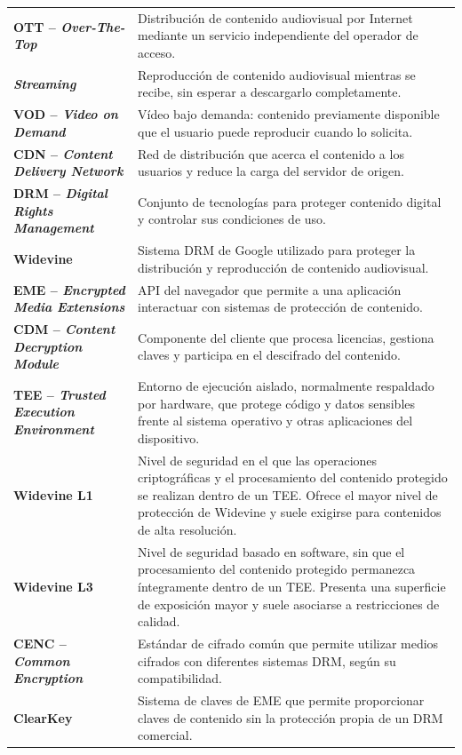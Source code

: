 \begin{longtable}{@{}>{\raggedright\arraybackslash\bfseries}p{}>{\raggedright\arraybackslash}p{}@{}}
OTT -- \textit{Over-The-Top} & Distribución de contenido audiovisual por Internet mediante un servicio independiente del operador de acceso. \\
\textit{Streaming} & Reproducción de contenido audiovisual mientras se recibe, sin esperar a descargarlo completamente. \\
VOD -- \textit{Video on Demand} & Vídeo bajo demanda: contenido previamente disponible que el usuario puede reproducir cuando lo solicita. \\
CDN -- \textit{Content Delivery Network} & Red de distribución que acerca el contenido a los usuarios y reduce la carga del servidor de origen. \\
DRM -- \textit{Digital Rights Management} & Conjunto de tecnologías para proteger contenido digital y controlar sus condiciones de uso. \\
Widevine & Sistema DRM de Google utilizado para proteger la distribución y reproducción de contenido audiovisual. \\
EME -- \textit{Encrypted Media Extensions} & API del navegador que permite a una aplicación interactuar con sistemas de protección de contenido. \\
CDM -- \textit{Content Decryption Module} & Componente del cliente que procesa licencias, gestiona claves y participa en el descifrado del contenido. \\
TEE -- \textit{Trusted Execution Environment} & Entorno de ejecución aislado, normalmente respaldado por hardware, que protege código y datos sensibles frente al sistema operativo y otras aplicaciones del dispositivo. \\
Widevine L1 & Nivel de seguridad en el que las operaciones criptográficas y el procesamiento del contenido protegido se realizan dentro de un TEE. Ofrece el mayor nivel de protección de Widevine y suele exigirse para contenidos de alta resolución. \\
Widevine L3 & Nivel de seguridad basado en software, sin que el procesamiento del contenido protegido permanezca íntegramente dentro de un TEE. Presenta una superficie de exposición mayor y suele asociarse a restricciones de calidad. \\
CENC -- \textit{Common Encryption} & Estándar de cifrado común que permite utilizar medios cifrados con diferentes sistemas DRM, según su compatibilidad. \\
ClearKey & Sistema de claves de EME que permite proporcionar claves de contenido sin la protección propia de un DRM comercial. \\

\end{longtable}
